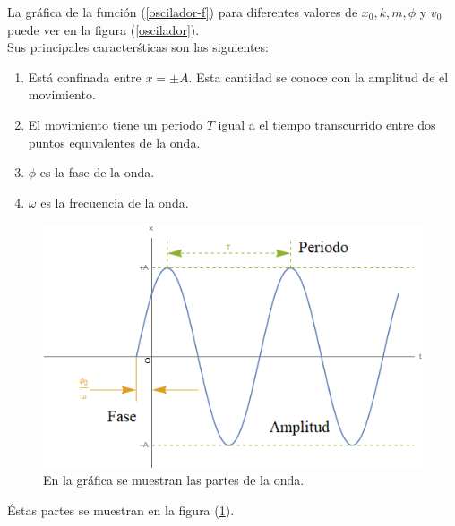 \documentclass[letterpaper,12pt,oneside]{book}
\begin{document}
%
La gr\'afica de la funci\'on (\ref{oscilador-f}) para diferentes valores de $x_0,  k,  m,  \phi$ y $v_0$ puede ver en la figura (\ref{oscilador}).\\
Sus principales caracter\'sticas son las siguientes:
%
\begin{enumerate}
  \item Est\'a confinada entre $x= \pm A$. Esta cantidad se conoce con la amplitud de el movimiento.
  \item El movimiento tiene un periodo $T$ igual a el tiempo transcurrido entre dos puntos equivalentes de la onda.
  \item $\phi$ es la fase de la onda.
  \item $\omega$ es la frecuencia de la onda.
\end{enumerate}
%
\begin{figure}
\centering
\includegraphics[scale=0.75]{onda}
\caption{\label{onda}  En la gr\'afica se muestran las partes de la onda.  }
\end{figure}
% 
\'Estas partes se muestran en la figura (\ref{onda}).

%
\end{document}
